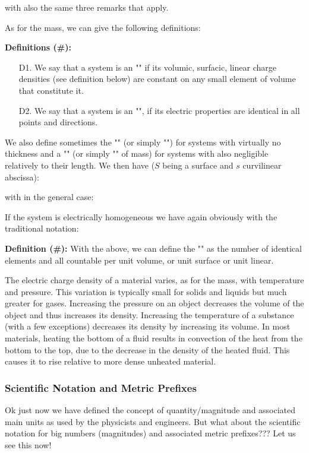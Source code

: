 	with also the same three remarks that apply.
	
	As for the mass, we can give the following definitions:
	
	\textbf{Definitions (\#\mydef):}
	\begin{enumerate}
		\item[D1.] We say that a system is an "" if its volumic, surfacic, linear charge densities (see definition below) are constant on any small element of volume that constitute it.

		\item[D2.] We say that a system is an "", if its electric properties are identical in all points and directions.
	\end{enumerate}
	We also define sometimes the "" (or simply "") for systems with virtually no thickness and a "" (or  simply "" of mass) for systems with also negligible relatively to their length. We then have ($S$ being a surface and $s$ curvilinear abscissa):
	
	with in the general case:
	
	If the system is electrically homogeneous we have again obviously with the traditional notation:
	
	\textbf{Definition (\#\mydef):} With the above, we can define the "" as the number of identical elements and all countable per unit volume, or unit surface or unit linear.
	
	The electric charge density of a material varies, as for the mass, with temperature and pressure. This variation is typically small for solids and liquids but much greater for gases. Increasing the pressure on an object decreases the volume of the object and thus increases its density. Increasing the temperature of a substance (with a few exceptions) decreases its density by increasing its volume. In most materials, heating the bottom of a fluid results in convection of the heat from the bottom to the top, due to the decrease in the density of the heated fluid. This causes it to rise relative to more dense unheated material.

	\pagebreak
	\subsubsection{Scientific Notation and Metric Prefixes}
	Ok just now we have defined the concept of quantity/magnitude and associated main units as used by the physicists and engineers. But what about the scientific notation for big numbers (magnitudes) and associated metric prefixes??? Let us see this now!
	
